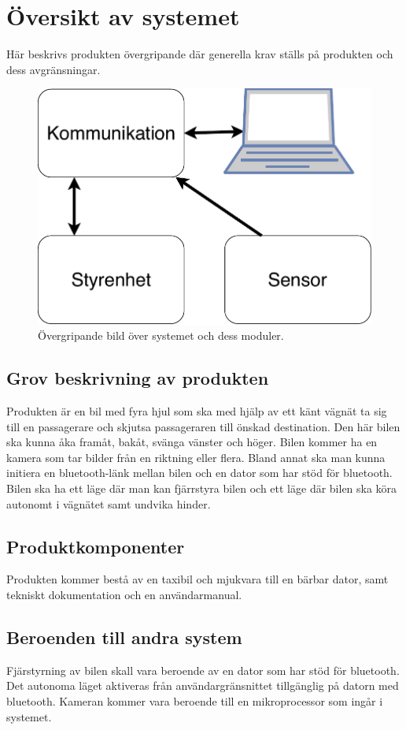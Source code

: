 \documentclass[kravspec/krav.tex]{subfiles}
\begin{document}
\section{Översikt av systemet}
Här beskrivs produkten övergripande där generella krav ställs på produkten och
dess avgränsningar.
\begin{figure}[h]
    \centering
    \includegraphics[width=0.6\linewidth]{kravspec/figures/overview-schema.pdf}
    \caption{Övergripande bild över systemet och dess moduler.}
    \label{fig:overview}
\end{figure}

\subsection{Grov beskrivning av produkten}
Produkten är en bil med fyra hjul som ska med hjälp av ett känt vägnät ta sig
till en passagerare och skjutsa passageraren till önskad destination. Den här
bilen ska kunna åka framåt, bakåt, svänga vänster och höger. Bilen kommer ha
en kamera som tar bilder från en riktning eller flera.  Bland annat ska
man kunna initiera en bluetooth-länk mellan bilen och en dator som har stöd för
bluetooth. Bilen ska ha ett läge där man kan fjärrstyra bilen och ett läge där
bilen ska köra autonomt i vägnätet samt undvika hinder.

\subsection{Produktkomponenter}
Produkten kommer bestå av en taxibil och mjukvara till en bärbar dator, samt
tekniskt dokumentation och en användarmanual.

\subsection{Beroenden till andra system}
Fjärstyrning av bilen skall vara beroende av en dator som har stöd för
bluetooth. Det autonoma läget aktiveras från användargränsnittet tillgänglig på
datorn med bluetooth. Kameran kommer vara beroende till en mikroprocessor som
ingår i systemet.
\end{document}
